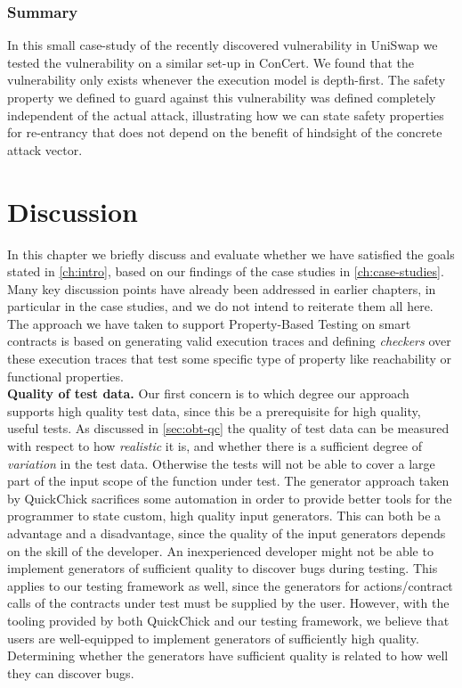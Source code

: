 \documentclass[twoside,11pt,openright]{report}
\newcommand{\pbt}{Property-Based Testing}
\begin{document}
\subsection{Summary}
In this small case-study of the recently discovered vulnerability in UniSwap we tested the vulnerability on a similar set-up in ConCert. We found that the vulnerability only exists whenever the execution model is depth-first. The safety property we defined to guard against this vulnerability was defined completely independent of the actual attack, illustrating how we can state safety properties for re-entrancy that does not depend on the benefit of hindsight of the concrete attack vector.


\chapter{Discussion}
\label{ch:evaluation}
In this chapter we briefly discuss and evaluate whether we have satisfied the goals stated in \autoref{ch:intro}, based on our findings of the case studies in \autoref{ch:case-studies}. Many key discussion points have already been addressed in earlier chapters, in particular in the case studies, and we do not intend to reiterate them all here.
\medskip\\
The approach we have taken to support \pbt{} on smart contracts is based on generating valid execution traces and defining \textit{checkers} over these execution traces that test some specific type of property like reachability or functional properties.
\medskip\\
\textbf{Quality of test data.} Our first concern is to which degree our approach supports high quality test data, since this be a prerequisite for high quality, useful tests. As discussed in \autoref{sec:obt-qc} the quality of test data can be measured with respect to how \textit{realistic} it is, and whether there is a sufficient degree of \textit{variation} in the test data. Otherwise the tests will not be able to cover a large part of the input scope of the function under test. The generator approach taken by QuickChick sacrifices some automation in order to provide better tools for the programmer to state custom, high quality input generators. This can both be a advantage and a disadvantage, since the quality of the input generators depends on the skill of the developer. An inexperienced developer might not be able to implement generators of sufficient quality to discover bugs during testing. This applies to our testing framework as well, since the generators for actions/contract calls of the contracts under test must be supplied by the user. However, with the tooling provided by both QuickChick and our testing framework, we believe that users are well-equipped to implement generators of sufficiently high quality. Determining whether the generators have sufficient quality is related to how well they can discover bugs.
\end{document}
